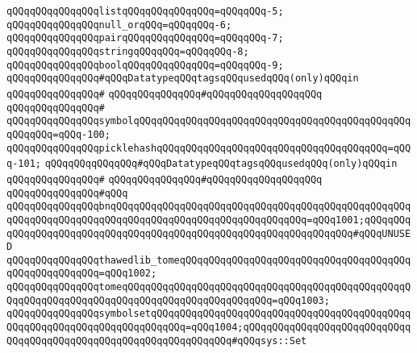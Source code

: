 \verb|qQQqqQQqqQQqqQQqlistqQQqqQQqqQQqqQQq=qQQqqQQq-5;|\newline
\verb|qQQqqQQqqQQqqQQqnull_orqQQq=qQQqqQQq-6;|\newline
\verb|qQQqqQQqqQQqqQQqpairqQQqqQQqqQQqqQQq=qQQqqQQq-7;|\newline
\verb|qQQqqQQqqQQqqQQqstringqQQqqQQq=qQQqqQQq-8;|\newline
\verb|qQQqqQQqqQQqqQQqboolqQQqqQQqqQQqqQQq=qQQqqQQq-9;|\newline
\newline
\verb|qQQqqQQqqQQqqQQq#qQQqDatatypeqQQqtagsqQQqusedqQQq(only)qQQqin|\newline
\verb|qQQqqQQqqQQqqQQq#|\newline
\verb|qQQqqQQqqQQqqQQq#qQQqqQQqqQQqqQQqqQQq|\newline
\verb|qQQqqQQqqQQqqQQq#|\newline
\verb|qQQqqQQqqQQqqQQqsymbolqQQqqQQqqQQqqQQqqQQqqQQqqQQqqQQqqQQqqQQqqQQqqQQqqQQqqQQq=qQQq-100;|\newline
\verb|qQQqqQQqqQQqqQQqpicklehashqQQqqQQqqQQqqQQqqQQqqQQqqQQqqQQqqQQqqQQq=qQQq-101;|\newline
\newline
\verb|qQQqqQQqqQQqqQQq#qQQqDatatypeqQQqtagsqQQqusedqQQq(only)qQQqin|\newline
\verb|qQQqqQQqqQQqqQQq#|\newline
\verb|qQQqqQQqqQQqqQQq#qQQqqQQqqQQqqQQqqQQq|\newline
\verb|qQQqqQQqqQQqqQQq#qQQq|\newline
\verb|qQQqqQQqqQQqqQQqbnqQQqqQQqqQQqqQQqqQQqqQQqqQQqqQQqqQQqqQQqqQQqqQQqqQQqqQQqqQQqqQQqqQQqqQQqqQQqqQQqqQQqqQQqqQQqqQQqqQQqqQQq=qQQq1001;qQQqqQQqqQQqqQQqqQQqqQQqqQQqqQQqqQQqqQQqqQQqqQQqqQQqqQQqqQQqqQQqqQQq#qQQqUNUSED|\newline
\verb|qQQqqQQqqQQqqQQqthawedlib_tomeqQQqqQQqqQQqqQQqqQQqqQQqqQQqqQQqqQQqqQQqqQQqqQQqqQQqqQQq=qQQq1002;|\newline
\verb|qQQqqQQqqQQqqQQqtomeqQQqqQQqqQQqqQQqqQQqqQQqqQQqqQQqqQQqqQQqqQQqqQQqqQQqqQQqqQQqqQQqqQQqqQQqqQQqqQQqqQQqqQQqqQQqqQQq=qQQq1003;|\newline
\verb|qQQqqQQqqQQqqQQqsymbolsetqQQqqQQqqQQqqQQqqQQqqQQqqQQqqQQqqQQqqQQqqQQqqQQqqQQqqQQqqQQqqQQqqQQqqQQqqQQq=qQQq1004;qQQqqQQqqQQqqQQqqQQqqQQqqQQqqQQqqQQqqQQqqQQqqQQqqQQqqQQqqQQqqQQqqQQq#qQQqsys::Set|\newline
